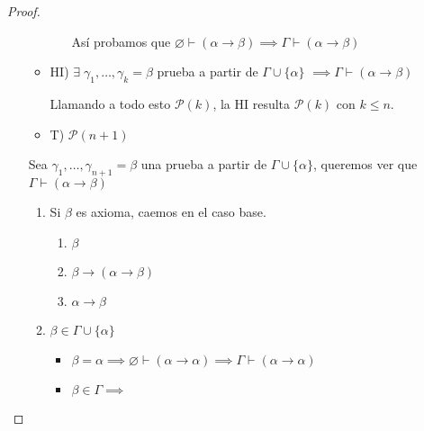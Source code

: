 \begin{proof}
\begin{itemize}
\begin{itemize}
\begin{enumerate}
                        Así probamos que 
                        $\varnothing\vdash(\alpha\to\beta)
                        \implies \Gamma \vdash (\alpha\to\beta)$

                    \end{enumerate}

                \item HI) $\exists \; \gamma_1, \dotsc, \gamma_k = \beta$ 
                    prueba a partir de $\Gamma \cup \{ \alpha \}$
                    $\implies \Gamma \vdash (\alpha\to\beta)$

                    Llamando a todo esto $\mathcal{P}(k)$, la HI resulta
                    $\mathcal{P}(k)$ con $k \leq n$.

                \item T) $\mathcal{P}(n+1)$
            \end{itemize}

            Sea $\gamma_1, \dotsc, \gamma_{n+1} = \beta$ una prueba a partir
            de $\Gamma \cup \{ \alpha \}$, queremos ver que
            $\Gamma \vdash (\alpha \to \beta)$
            \begin{enumerate}[%
                            labelindent=*,
                            style=multiline,
                            leftmargin=*,
                            align=left,
                            leftmargin=2\parindent,
                            label=Caso \arabic*)]
                \item Si $\beta$ es axioma, caemos en el caso base.

                    \begin{enumerate}
                        \item $\beta$ %
                        \item $\beta\to(\alpha\to\beta)$ %
                        \item $\alpha \to \beta$
                    \end{enumerate}

                \item $\beta \in \Gamma \cup \{\alpha\}$
                    \begin{itemize}
                        \item $\beta=\alpha 
                            \implies \varnothing\vdash(\alpha\to\alpha)
                            \implies \Gamma\vdash(\alpha\to\alpha)$
                        \item $\beta \in \Gamma \implies$ 


\end{itemize}
\end{enumerate}
\end{itemize}
\end{proof}
